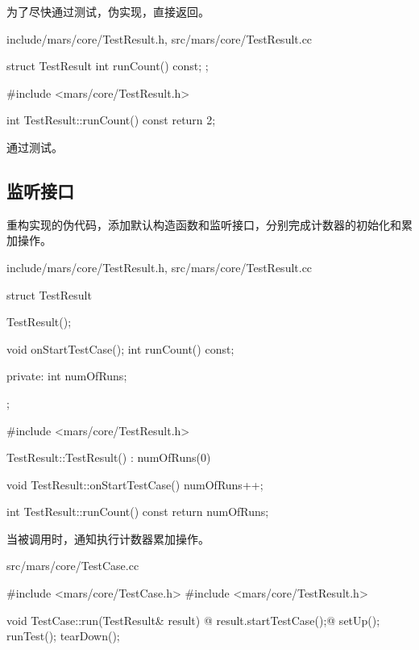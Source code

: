 \begin{content}
为了尽快通过测试，伪实现，直接返回。

\begin{diff}{include/mars/core/TestResult.h, src/mars/core/TestResult.cc}
 \begin{minicpp}
struct TestResult {
  int runCount() const;
};
 \end{minicpp}
\tcblower
 \begin{minicpp}
#include <mars/core/TestResult.h>

int TestResult::runCount() const {
  return 2;
}
 \end{minicpp}
\end{diff}

通过测试。

\subsection{监听接口}

重构实现的伪代码，添加默认构造函数和监听接口，分别完成计数器的初始化和累加操作。

\begin{diff}{include/mars/core/TestResult.h, src/mars/core/TestResult.cc}
 \begin{minicpp}
struct TestResult {
  TestResult();

  void onStartTestCase();
  int runCount() const;

private:
  int numOfRuns;
};
 \end{minicpp}
\tcblower
 \begin{minicpp}
#include <mars/core/TestResult.h>

TestResult::TestResult() : numOfRuns(0) {
}

void TestResult::onStartTestCase() {
  numOfRuns++;
}

int TestResult::runCount() const {
  return numOfRuns;
}
 \end{minicpp}
\end{diff}

当被调用时，通知执行计数器累加操作。

\begin{nodiff}{src/mars/core/TestCase.cc}
 \begin{c++}
#include <mars/core/TestCase.h>
#include <mars/core/TestResult.h>

void TestCase::run(TestResult& result) {
@  result.startTestCase();@
  setUp();
  runTest();
  tearDown();
}
 \end{c++}
\end{nodiff}


\end{content}
